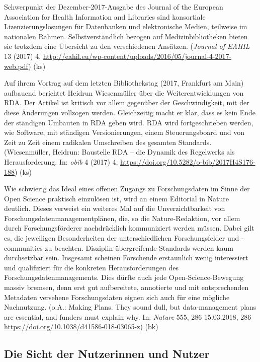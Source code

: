 \documentclass[a4paper,
fontsize=11pt,
oneside,
numbers=noperiodatend,
parskip=half-,
bibliography=totoc,
final
]{scrartcl}
\begin{document}
Schwerpunkt der Dezember-2017-Ausgabe des Journal of the European
Association for Health Information and Libraries sind konsortiale
Lizenzierungslösungen für Datenbanken und elektronische Medien,
teilweise im nationalen Rahmen. Selbstverständlich bezogen auf
Medizinbibliotheken bieten sie trotzdem eine Übersicht zu den
verschiedenen Ansätzen. (\emph{Journal of EAHIL} 13 (2017) 4,
\url{http://eahil.eu/wp-content/uploads/2016/05/journal-4-2017-web.pdf})
(ks)

Auf ihrem Vortrag auf dem letzten Bibliothekstag (2017, Frankfurt am
Main) aufbauend berichtet Heidrun Wiesenmüller über die
Weiterentwicklungen von RDA. Der Artikel ist kritisch vor allem
gegenüber der Geschwindigkeit, mit der diese Änderungen vollzogen
werden. Gleichzeitig macht er klar, dass es kein Ende der ständigen
Umbauten in RDA geben wird. RDA wird fortgeschrieben werden, wie
Software, mit ständigen Versionierungen, einem Steuerungsboard und von
Zeit zu Zeit einem radikalen Umschreiben des gesamten Standards.
(Wiesenmüller, Heidrun: Baustelle RDA -- die Dynamik des Regelwerks als
Herausforderung. In: \emph{o\textbar{}bib} 4 (2017) 4,
\url{https://doi.org/10.5282/o-bib/2017H4S176-188}) (ks)

Wie schwierig das Ideal eines offenen Zugangs zu Forschungsdaten im
Sinne der Open Science praktisch einzulösen ist, wird an einem Editorial
in Nature deutlich. Dieses verweist ein weiteres Mal auf die
Unverzichtbarkeit von Forschungsdatenmanagementplänen, die, so die
Nature-Redaktion, vor allem durch Forschungsförderer nachdrücklich
kommuniziert werden müssen. Dabei gilt es, die jeweiligen Besonderheiten
der unterschiedlichen Forschungsfelder und -com\-mu\-ni\-ties zu beachten.
Disziplin-übergreifende Standards werden kaum durchsetzbar sein.
Insgesamt scheinen Forschende erstaunlich wenig interessiert und
qualifiziert für die konkreten Herausforderungen des
Forschungsdatenmanagements. Dies dürfte auch jede Open-Science-Bewegung
massiv bremsen, denn erst gut aufbereitete, annotierte und mit
entsprechenden Metadaten versehene Forschungsdaten eignen sich auch für
eine mögliche Nachnutzung. (o.A.: Making Plans. They sound dull, but
data-management plans are essential, and funders must explain why. In:
\emph{Nature} 555, 286 15.03.2018, 286
\url{https://doi.org/10.1038/d41586-018-03065-z}) (bk)

\hypertarget{die-sicht-der-nutzerinnen-und-nutzer}{%
\subsection{Die Sicht der Nutzerinnen und
Nutzer}\label{die-sicht-der-nutzerinnen-und-nutzer}}
\end{document}
